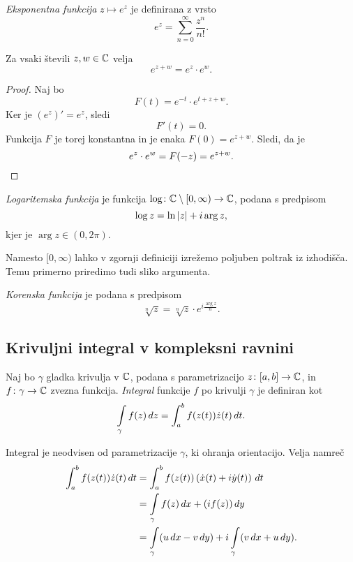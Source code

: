 \begin{definicija}
\emph{Eksponentna funkcija}
$z \mapsto e^z$ je definirana z vrsto
\[
e^z = \sum_{n=0}^\infty \frac{z^n}{n!}.
\]
\end{definicija}

\begin{trditev}
Za vsaki števili $z, w \in \mathbb{C}$ velja
\[
e^{z+w} = e^z \cdot e^w.
\]
\end{trditev}

\begin{proof}
Naj bo
\[
F(t) = e^{-t} \cdot e^{t + z + w}.
\]
Ker je $(e^z)' = e^z$, sledi
\[
F'(t) = 0.
\]
Funkcija $F$ je torej konstantna in je enaka $F(0) = e^{z+w}$.
Sledi, da je
\[
e^z \cdot e^w = F(-z) = e^{z+w}. \qedhere
\]
\end{proof}

\begin{definicija}
\emph{Logaritemska funkcija} je
funkcija $\log \colon \mathbb{C} \setminus [0, \infty) \to \mathbb{C}$, podana s
predpisom
\[
\log z = \ln \left\lvert z\right\rvert + i \arg z,
\]
kjer je $\arg z \in (0, 2\pi)$.
\end{definicija}

\begin{opomba}
Namesto $[0, \infty)$ lahko v zgornji definiciji izrežemo poljuben
poltrak iz izhodišča. Temu primerno priredimo tudi sliko argumenta.
\end{opomba}

\begin{definicija}
\emph{Korenska funkcija} je podana s
predpisom
\[
\sqrt[n]{z} = \sqrt[n]{z} \cdot e^{i \frac{\arg z}{n}}.
\]
\end{definicija}

\newpage

\subsection{Krivuljni integral v kompleksni ravnini}

\begin{definicija}
Naj bo $\gamma$ gladka krivulja v $\mathbb{C}$, podana s parametrizacijo
$z \colon [a, b] \to \mathbb{C}$, in $f \colon \gamma \to \mathbb{C}$ zvezna
funkcija. \emph{Integral} funkcije $f$
po krivulji $\gamma$ je definiran kot
\[
\int\limits_{\gamma} f(z)\,dz =
\int_a^b f(z(t)) \dot{z}(t)\,dt.
\]
\end{definicija}

\begin{opomba}
Integral je neodvisen od parametrizacije $\gamma$, ki ohranja
orientacijo. Velja namreč
\begin{align*}
\int_a^b f(z(t)) \dot{z}(t)\,dt &=
\int_a^b f(z(t)) \left(\dot{x}(t) + i \dot{y}(t)\right)\,dt
\\
&=
\int\limits_{\gamma} f(z)\,dx + (if(z))\,dy
\\
&=
\int\limits_{\gamma} (u\,dx - v\,dy) + i \int\limits_{\gamma} (v\,dx + u\,dy).
\end{align*}
\end{opomba}

